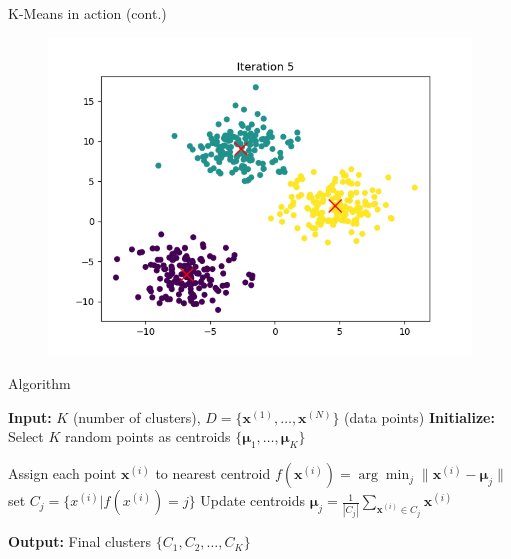 \documentclass[serif, aspectratio=169]{beamer}
\begin{document}
\begin{frame}{K-Means in action (cont.)}
    \begin{figure}
        \centering
        \includegraphics[width=\textwidth]{kmeans_in_action_figures/kmeans_iter_5.png}
    \end{figure}
\end{frame}

\begin{frame}{Algorithm}
    \begin{algorithm}[H]
    \caption{K-means Clustering}\label{alg:KMeans}
    \begin{algorithmic}[1]
        \State \textbf{Input:} $K$ (number of clusters), $D = \{\boldsymbol{x}^{(1)}, \dots, \boldsymbol{x}^{(N)}\}$ (data points)
        \State \textbf{Initialize:} Select $K$ random points as centroids $\{\boldsymbol{\mu}_1, \dots, \boldsymbol{\mu}_K\}$

        \Repeat
            \State
            Assign each point $\boldsymbol{x}^{(i)}$ to nearest centroid $f(\boldsymbol{x}^{(i)} ) = \arg \min_{j} \|\boldsymbol{x}^{(i)} - \boldsymbol{\mu}_j\|$
            \State \EndFor
            \State {}
             \State set $C_j = \{x^{(i)}|f(x^{(i)})=j\}$
             \State Update centroids $\boldsymbol{\mu}_j = \frac{1}{|C_j|} 
             \sum_{\boldsymbol{x}^{(i)} \in C_j} \boldsymbol{x}^{(i)}$
             \State \EndFor
    
        \State \textbf{Output:} Final clusters $\{C_1, C_2, \dots, C_K\}$
    \end{algorithmic}
    \end{algorithm}
\end{frame}
\end{document}
